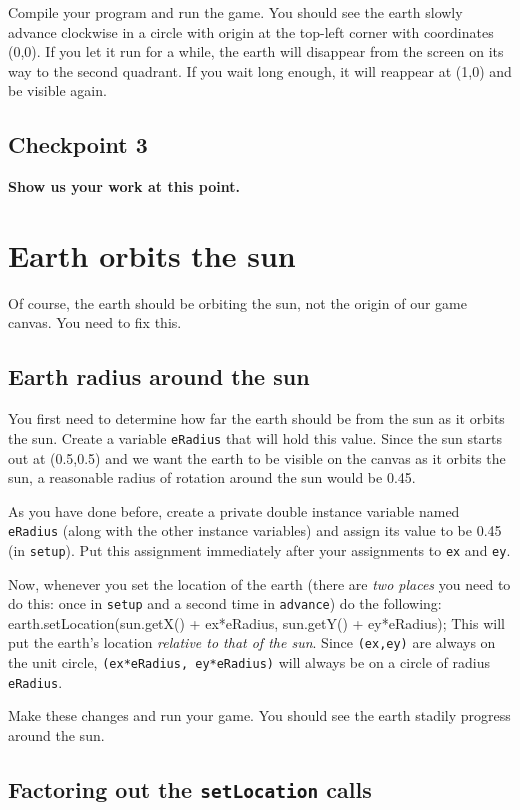 \documentclass[11pt]{article}
\newenvironment{qv}%
  {\quote
   \verbatim}%
  {\endverbatim
   \endquote}
\begin{document}
Compile your program and run the game.
You should see the earth slowly advance clockwise
in a circle with origin at the top-left corner with coordinates (0,0).
If you let it run for a while, the earth will disappear from the screen
on its way to the second quadrant.
If you wait long enough, it will reappear at (1,0) and be visible again.

\subsection*{Checkpoint 3}
{\bf
Show us your work at this point.
}

\section*{Earth orbits the sun}
Of course, the earth should be orbiting the sun,
not the origin of our game canvas.
You need to fix this.

\subsection*{Earth radius around the sun}
You first need to determine how far the earth should be from the sun
as it orbits the sun.
Create a variable {\tt eRadius} that will hold this value.
Since the sun starts out at (0.5,0.5) and we want the earth to be visible
on the canvas as it orbits the sun,
a reasonable radius of rotation around the sun would be 0.45.

As you have done before,
create a private double instance variable named {\tt eRadius}
(along with the other instance variables)
and assign its value to be 0.45 (in {\tt setup}).
Put this assignment immediately after your assignments
to {\tt ex} and {\tt ey}.

Now, whenever you set the location of the earth
(there are {\em two places} you need to do this:
once in {\tt setup} and a second time in {\tt advance})
do the following:
\begin{qv}
earth.setLocation(sun.getX() + ex*eRadius, sun.getY() + ey*eRadius);
\end{qv}
This will put the earth's location {\em relative to that of the sun}.
Since {\tt (ex,ey)} are always on the unit circle,
{\tt (ex*eRadius, ey*eRadius)} will always be
on a circle of radius {\tt eRadius}.

Make these changes and run your game.
You should see the earth stadily progress around the sun.

\subsection*{Factoring out the {\tt setLocation} calls}
\end{document}
